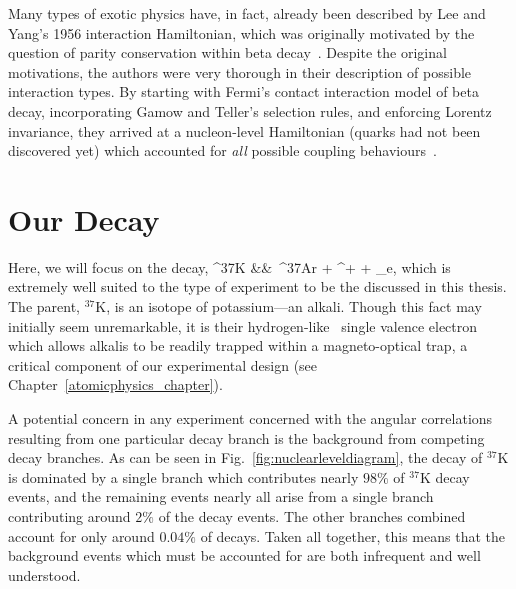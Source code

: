 Many types of exotic physics have, in fact, already been described by Lee and Yang's 1956 interaction Hamiltonian, which was originally motivated by the question of parity conservation within beta decay~\cite{LeeYang}.  Despite the original motivations, the authors were very thorough in their description of possible interaction types.  By starting with Fermi's contact interaction model of beta decay, incorporating Gamow and Teller's selection rules, and enforcing Lorentz invariance, they arrived at a nucleon-level Hamiltonian (quarks had not been discovered yet) which accounted for \emph{all} possible coupling behaviours~\cite{GamowTeller}. 







\section{Our Decay}
Here, we will focus on the decay,
\bea
^{37}\textrm{K} &\rightarrow& \,^{37}\textrm{\!Ar} + \beta^{+} + \nu_e, 
\label{eq:ourdecay}
\eea
which is extremely well suited to the type of experiment to be the discussed in this thesis.  
The parent, $^{37}\textrm{K}$, is an isotope of potassium---an alkali.  Though this fact may initially seem unremarkable, it is their hydrogen-like~ single valence electron which allows alkalis to be readily trapped within a magneto-optical trap, a critical component of our experimental design (see Chapter~\ref{atomicphysics_chapter}).

A potential concern in any experiment concerned with the angular correlations resulting from one particular decay branch is the background from competing decay branches.  As can be seen in Fig.~\ref{fig:nuclearleveldiagram}, the decay of $^{37}\textrm{K}$ is dominated by a single branch which contributes nearly $98\%$ of $^{37}\textrm{K}$ decay events, and the remaining events nearly all arise from a single branch contributing around $2\%$ of the decay events.  The other branches combined account for only around $0.04\%$ of decays.  Taken all together, this means that the background events which must be accounted for are both infrequent and well understood.

